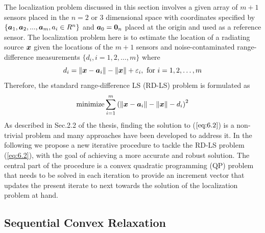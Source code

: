 The localization problem discussed in this section involves a given array of $m+1$ sensors placed in the $n = 2$ or 3 dimensional space with coordinates specified by $\{\mbox{\boldmath$a$}_1, \mbox{\boldmath$a$}_2, . . . , \mbox{\boldmath$a$}_m , a_i \in R^n\}$ and  $\mbox{\boldmath$a$}_0 = \mbox{\boldmath${0}$}_n$ placed at the origin and used as a reference sensor. The localization problem here is to estimate the location of a radiating source $\mbox{\boldmath$x$}$ given the locations of the $m+1$ sensors and noise-contaminated range-difference measurements $\{d_i, i = 1, 2, \ldots, m\}$ where 
\setcounter{abc}{0}
\begin{equation} \label{eq:6.1}
d_i = \|\mbox{\boldmath$x$} - \mbox{\boldmath$a$}_i\| - \|\mbox{\boldmath$x$}\| + \varepsilon_i, \mbox{ for } i = 1, 2, \ldots, m
\end{equation}
Therefore, the standard range-difference LS (RD-LS) problem is formulated as
\begin{equation} \label{eq:6.2}
\mathop{\mbox{minimize}} \sum^m_{i=1}\left( \|\mbox{\boldmath$x$} - \mbox{\boldmath$a$}_i\| - \|\mbox{\boldmath$x$}\| - d_i\right)^2
\end{equation}
As described in Sec.2.2 of the thesis, finding the solution to ($\ref{eq:6.2}$) is a non-trivial problem and many approaches have been developed to address it. In the following we propose a new iterative procedure to tackle the RD-LS problem (\ref{eq:6.2}), with the goal of achieving a more accurate and robust solution. The central part of the procedure is a convex quadratic programming (QP) problem that needs to be solved in each iteration to provide an increment vector that updates the present iterate to next towards the solution of the localization problem at hand.

\subsection{Sequential Convex Relaxation}

%
%
%

